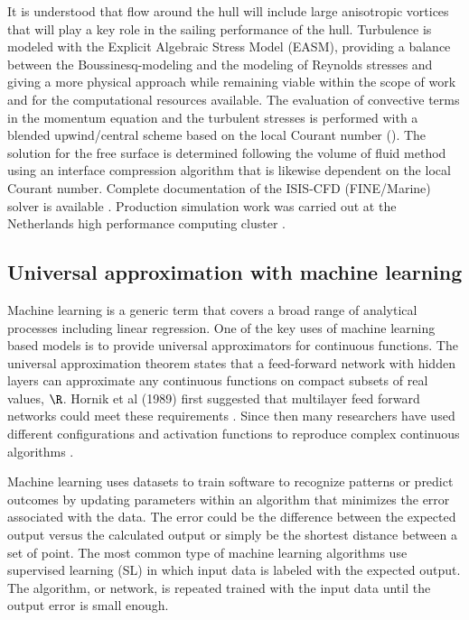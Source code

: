 \documentclass[twoside,twocolumn]{article}
\begin{document}
	It is understood that flow around the hull will include large anisotropic vortices that will play a key role in the sailing performance of the hull. Turbulence is modeled with the Explicit Algebraic Stress Model (EASM), providing a balance between the Boussinesq-modeling and the modeling of Reynolds stresses and giving a more physical approach while remaining viable within the scope of work and for the computational resources available. The evaluation of convective terms in the momentum equation and the turbulent stresses is performed with a blended upwind/central scheme based on the local Courant number (\Co). The solution for the free surface is determined following the volume of fluid method using an interface compression algorithm that is likewise dependent on the local Courant number. Complete documentation of the ISIS-CFD (FINE/Marine) solver is available \cite{Numeca1}. Production simulation work was carried out at the Netherlands high performance computing cluster \cite{SARA1}.
	
	\subsection{Universal approximation with machine learning}
	
	Machine learning is a generic term that covers a broad range of analytical processes including linear regression. One of the key uses of machine learning based models is to provide universal approximators for continuous functions. The universal approximation theorem states that a feed-forward network with hidden layers can approximate any continuous functions on compact subsets of real values, $\R$. Hornik et al (1989) first suggested that multilayer feed forward networks could meet these requirements \cite{Hornik1989}. Since then many researchers have used different configurations and activation functions to reproduce complex continuous algorithms \cite{Mhaskar2016,Hanin2017, Segol2019}.

Machine learning uses datasets to train software to recognize patterns or predict outcomes by updating parameters within an algorithm that minimizes the error associated with the data. The error could be the difference between the expected output versus the calculated output or simply be the shortest distance between a set of point. The most common type of machine learning algorithms use supervised learning (SL) in which input data is labeled with the expected output. The algorithm, or network, is repeated trained with the input data until the output error is small enough.
	
\end{document}
